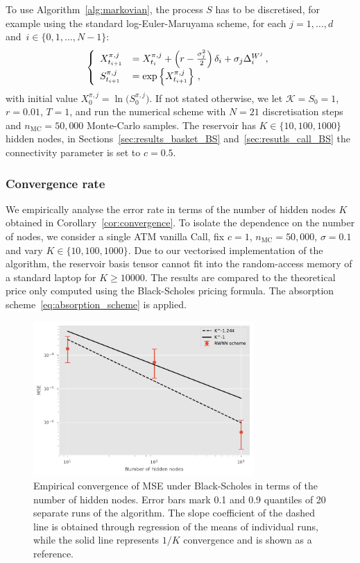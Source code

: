 To use Algorithm~\ref{alg:markovian}, the process $S$ has to be discretised, for example using the standard log-Euler-Maruyama scheme, for each $j=1,\ldots, d$ and~${i\in\{0,1,\dots,N-1\}}$:
\begin{equation*}
\left\{
\begin{array}{ll}
    X^{\pi, j}_{t_{i+1}} &= X^{\pi, j}_{t_{i}}
    + \left(r-\frac{\sigma_j^2}{2}\right)\delta_{i}  + \sigma_j\Delta^{W^j}_{i}\,, \\
    S^{\pi, j}_{t_{i+1}} &= \exp\left\{X^{\pi, j}_{t_{i+1}}\right\}\,,
\end{array}
\right.
\end{equation*}
with initial value $X^{\pi, j}_0=\ln\big(S^{\pi, j}_0\big)$.
If not stated otherwise, we let $\mathscr{K}=S_0=1$, $r=0.01$, $T=1$,
and run the numerical scheme with $N=21$ discretisation steps and $n_{\mathrm{MC}}=50,000$ Monte-Carlo samples. 
The reservoir has $K\in\{10, 100, 1000\}$ hidden nodes, in Sections~\ref{sec:results_basket_BS} and~\ref{sec:resutls_call_BS} the connectivity parameter is set to $c=0.5$.

\subsubsection{Convergence rate}\label{sec:BS_convergence_rate}
We empirically analyse the error rate in terms of the number of hidden nodes $K$ obtained in Corollary~\ref{cor:convergence}. To isolate the dependence on the number of nodes, we consider a single ATM vanilla Call, fix $c=1$, $n_{\mathrm{MC}}=50,000$, $\sigma=0.1$ and vary $K\in\{10, 100, 1000\}$. Due to our vectorised implementation of the algorithm, the reservoir basis tensor cannot fit into the random-access memory of a standard laptop for $K \geq 10000$. The results are compared to the theoretical price only computed using the Black-Scholes pricing formula. The absorption scheme~\eqref{eq:absorption_scheme} is applied. 

\begin{figure}[hbt!]%
    \centering
    \includegraphics[width=0.75\textwidth]{content/reschap2/Figures/BS_convergence_K_1e3.pdf}
    \caption{Empirical convergence of MSE under Black-Scholes in terms of the number of hidden nodes. Error bars mark 0.1 and 0.9 quantiles of 20 separate runs of the algorithm. The slope coefficient of the dashed line is obtained through regression of the means of individual runs, while the solid line represents $1/K$ convergence and is shown as a reference.}
    \label{fig:BSconvergence}
\end{figure}

